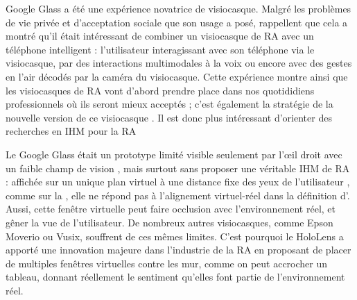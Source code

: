 
Google Glass a été une expérience novatrice de visiocasque. Malgré les problèmes de vie privée et d'acceptation sociale que son usage a posé, \cite{Koelle2015} rappellent que cela a montré qu'il était intéressant de combiner un visiocasque de RA avec un téléphone intelligent : l'utilisateur interagissant avec son téléphone via le visiocasque, par des interactions multimodales à la voix ou encore avec des gestes en l'air décodés par la caméra du visiocasque. Cette expérience montre ainsi que les visiocasques de RA vont d'abord prendre place dans nos quotididiens professionnels où ils seront mieux acceptés ; c'est également la stratégie de la nouvelle version de ce visiocasque \cite{Levi2017}. Il est donc plus intéressant d'orienter des recherches en IHM pour la RA

Le Google Glass était un prototype limité visible seulement par l'\oe il droit avec un faible champ de vision , mais surtout sans proposer une véritable IHM de RA : affichée sur un unique plan virtuel à une distance fixe des yeux de l'utilisateur , comme sur la , elle ne répond pas à l'alignement virtuel-réel dans la définition d'\cite{Azuma1997}. Aussi, cette fenêtre virtuelle peut faire occlusion avec l'environnement réel, et gêner la vue de l'utilisateur. De nombreux autres visiocasques, comme Epson Moverio ou Vusix, souffrent de ces mêmes limites. C'est pourquoi le HoloLens a apporté une innovation majeure dans l'industrie de la RA en proposant de placer de multiples fenêtres virtuelles contre les mur, comme on peut accrocher un tableau, donnant réellement le sentiment qu'elles font partie de l'environnement réel.


